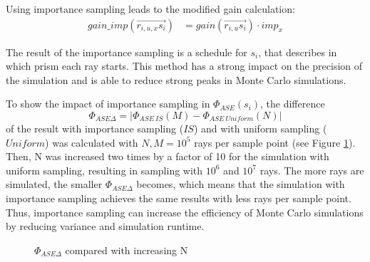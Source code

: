 Using importance sampling leads to the modified gain calculation:
\begin{align}
  gain\_imp(\overrightarrow{r_{i,u,x}s_i})        &= gain(\overrightarrow{r_{i,u}s_i}) \cdot imp_x
\end{align}


The result of the importance sampling is a schedule for $s_i$, that
describes in which prism each ray starts.
This method has a strong impact on the precision of the simulation
and is able to reduce strong peaks in Monte Carlo simulations.

To show the impact of importance sampling in $\Phi_{ASE}(s_i)$, the difference
\[\Phi_{ASE\Delta} = |\Phi_{ASE~IS}(M) - \Phi_{ASE~Uniform}(N)|\] of the 
result with importance sampling ($IS$) and with uniform sampling ($Uniform$) was calculated with 
$N,M = 10^5$ rays per sample point (see Figure \ref{graphic:importance}). 
Then, N was increased two times by a factor of 10 for the simulation with uniform sampling, resulting in sampling with $10^6$ and $10^7$ rays.
The more rays are simulated, the smaller $\Phi_{ASE\Delta}$ becomes, which 
means that the simulation
with importance sampling achieves the same results with less
rays per sample point. Thus, importance sampling can increase the
efficiency of Monte Carlo simulations by reducing variance 
and simulation runtime. 
\begin{figure}[H]
  \centerline
  {}
  \caption{$\Phi_{ASE\Delta}$ compared with increasing N}
  \label{graphic:importance}
\end{figure}

